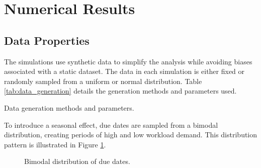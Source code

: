 \documentclass[12pt]{article}
\begin{document}
\section*{Numerical Results}

\subsection*{Data Properties}

The simulations use synthetic data to simplify the analysis while avoiding biases associated with a static dataset. The data in each simulation is either fixed or randomly sampled from a uniform or normal distribution. Table \ref{tab:data_generation} details the generation methods and parameters used.

\begin{table}[h]
    \centering
    \caption{Data generation methods and parameters.}
    \label{tab:data_generation}
\end{table}

To introduce a seasonal effect, due dates are sampled from a bimodal distribution, creating periods of high and low workload demand. This distribution pattern is illustrated in Figure \ref{fig:bimodal_due_dates}.

\begin{figure}[h]
    \centering
    \caption{Bimodal distribution of due dates.}
    \label{fig:bimodal_due_dates}
\end{figure}






\end{document}
